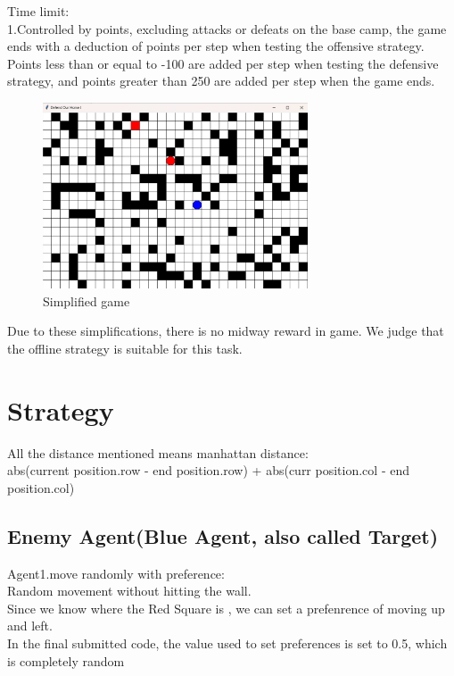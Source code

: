 \documentclass{article}
\begin{document}
	Time limit:\\
	1.Controlled by points, excluding attacks or defeats on the base camp, the game ends with a deduction of points per step when testing the offensive strategy. Points less than or equal to -100 are added per step when testing the defensive strategy, and points greater than 250 are added per step when the game ends.\\
	
	\begin{figure}[H]
		\centering
		\includegraphics[width=0.7\textwidth]{simplified.png}
		\caption{Simplified game}
	\end{figure} 

	Due to these simplifications, there is no midway reward in game. We judge that the offline strategy is suitable for this task.\\
		

\section{Strategy}
\label{gen_inst}
All the distance mentioned means manhattan distance:\\
abs(current position.row - end position.row) + abs(curr position.col - end position.col)\\
\subsection{Enemy Agent(Blue Agent, also called Target)}
Agent1.move randomly with preference:\\
Random movement without hitting the wall. \\
Since we know where the Red Square is , we can set a prefenrence of moving up and left.\\
In the final submitted code, the value used to set preferences is set to 0.5, which is completely random\\
\end{document}
